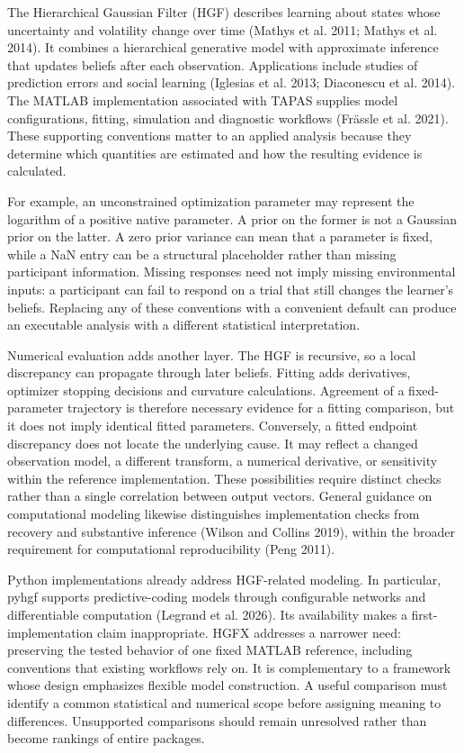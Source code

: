 \documentclass[
  11pt,
]{article}
\begin{document}
The Hierarchical Gaussian Filter (HGF) describes learning about states
whose uncertainty and volatility change over time (Mathys et al. 2011;
Mathys et al. 2014). It combines a hierarchical generative model with
approximate inference that updates beliefs after each observation.
Applications include studies of prediction errors and social learning
(Iglesias et al. 2013; Diaconescu et al. 2014). The MATLAB
implementation associated with TAPAS supplies model configurations,
fitting, simulation and diagnostic workflows (Frässle et al. 2021).
These supporting conventions matter to an applied analysis because they
determine which quantities are estimated and how the resulting evidence
is calculated.

For example, an unconstrained optimization parameter may represent the
logarithm of a positive native parameter. A prior on the former is not a
Gaussian prior on the latter. A zero prior variance can mean that a
parameter is fixed, while a NaN entry can be a structural placeholder
rather than missing participant information. Missing responses need not
imply missing environmental inputs: a participant can fail to respond on
a trial that still changes the learner's beliefs. Replacing any of these
conventions with a convenient default can produce an executable analysis
with a different statistical interpretation.

Numerical evaluation adds another layer. The HGF is recursive, so a
local discrepancy can propagate through later beliefs. Fitting adds
derivatives, optimizer stopping decisions and curvature calculations.
Agreement of a fixed-parameter trajectory is therefore necessary
evidence for a fitting comparison, but it does not imply identical
fitted parameters. Conversely, a fitted endpoint discrepancy does not
locate the underlying cause. It may reflect a changed observation model,
a different transform, a numerical derivative, or sensitivity within the
reference implementation. These possibilities require distinct checks
rather than a single correlation between output vectors. General
guidance on computational modeling likewise distinguishes implementation
checks from recovery and substantive inference (Wilson and Collins
2019), within the broader requirement for computational reproducibility
(Peng 2011).

Python implementations already address HGF-related modeling. In
particular, pyhgf supports predictive-coding models through configurable
networks and differentiable computation (Legrand et al. 2026). Its
availability makes a first-implementation claim inappropriate. HGFX
addresses a narrower need: preserving the tested behavior of one fixed
MATLAB reference, including conventions that existing workflows rely on.
It is complementary to a framework whose design emphasizes flexible
model construction. A useful comparison must identify a common
statistical and numerical scope before assigning meaning to differences.
Unsupported comparisons should remain unresolved rather than become
rankings of entire packages.
\end{document}
